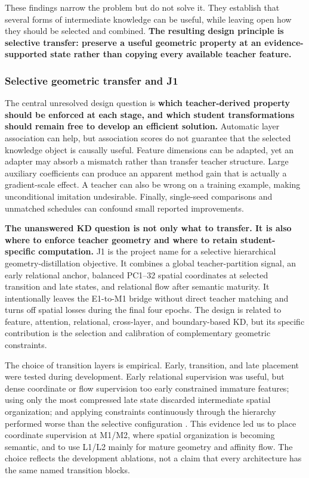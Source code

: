 These findings narrow the problem but do not solve it. They establish that
several forms of intermediate knowledge can be useful, while leaving open how
they should be selected and combined. \textbf{The resulting design principle
is selective transfer: preserve a useful geometric property at an
evidence-supported state rather than copying every available teacher feature.}

\subsubsection{Selective geometric transfer and J1}

The central unresolved design question is \textbf{which teacher-derived
property should be enforced at each stage, and which student transformations
should remain free to develop an efficient solution.} Automatic layer
association can help, but association scores do not guarantee that the selected
knowledge object is causally useful.
Feature dimensions can be adapted, yet an adapter may absorb a mismatch rather
than transfer teacher structure. Large auxiliary coefficients can produce an
apparent method gain that is actually a gradient-scale effect. A teacher can
also be wrong on a training example, making unconditional imitation
undesirable. Finally, single-seed comparisons and unmatched schedules can
confound small reported improvements.

\textbf{The unanswered KD question is not only what to transfer. It is also
where to enforce teacher geometry and where to retain
student-specific computation.} J1 is the project name for a selective
hierarchical geometry-distillation objective. It combines a global
teacher-partition signal, an early relational anchor, balanced PC1--32 spatial
coordinates at selected transition and late states, and relational flow after
semantic maturity. It intentionally leaves the E1-to-M1 bridge without direct
teacher matching and turns off spatial losses during the final four epochs.
The design is related to feature, attention, relational, cross-layer, and
boundary-based KD, but its specific contribution is the selection and
calibration of complementary geometric constraints.

The choice of transition layers is empirical. Early, transition, and late
placement were tested during development. Early relational supervision was
useful, but dense coordinate or flow supervision too early constrained
immature features; using only the most compressed late state discarded
intermediate spatial organization; and applying constraints continuously
through the hierarchy performed worse than the selective configuration
\cite{chan2026j1}. This evidence led us to place coordinate supervision at
M1/M2, where spatial organization is becoming semantic, and to use L1/L2 mainly
for mature geometry and affinity flow. The choice reflects the
development ablations, not a claim that every architecture has the same named
transition blocks.

